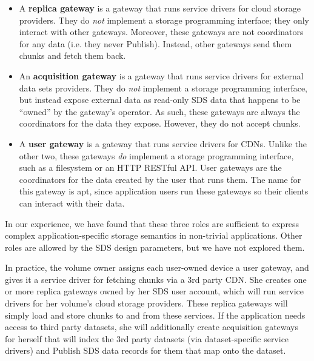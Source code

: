 {\begin{itemize}
    \item A \textbf{replica gateway} is a gateway that runs service drivers for
cloud storage providers.  They do \emph{not} implement a storage programming
interface; they only interact with other gateways.  Moreover, these gateways are
not coordinators for any data (i.e. they never Publish).  Instead, other gateways send
them chunks and fetch them back.
    \item An \textbf{acquisition gateway} is a gateway that runs service drivers
for external data sets providers.  They do \emph{not} implement a storage
programming interface, but instead expose external data as read-only SDS data that happens
to be ``owned'' by the gateway's operator.  As such, these gateways are always
the coordinators for the data they expose.  However, they do not accept chunks.
    \item A \textbf{user gateway} is a gateway that runs service drivers for
CDNs.  Unlike the other two, these gateways \emph{do} implement a storage
programming interface, such as a filesystem or an HTTP RESTful API.
User gateways are the coordinators for the data created by the user that runs
them.  The name for this gateway is apt, since application users run
these gateways so their clients can interact with their data.
\end{itemize}

In our experience, we have found that these three roles are sufficient to
express complex application-specific storage semantics in non-trivial
applications.  Other roles are allowed by the SDS design parameters, but we have
not explored them.

In practice, the volume owner assigns each user-owned device a
user gateway, and gives it a service driver for fetching chunks via a 3rd party
CDN.  She creates one or more replica gateways owned by her SDS user account,
which will run service drivers for her volume's cloud storage providers.  These
replica gateways will simply load and store chunks to and from these services.
If the application needs access to
third party datasets, she will additionally create acquisition gateways for
herself that will index the 3rd party datasets (via dataset-specific service
drivers) and Publish SDS data records for them that map onto the dataset.

}
